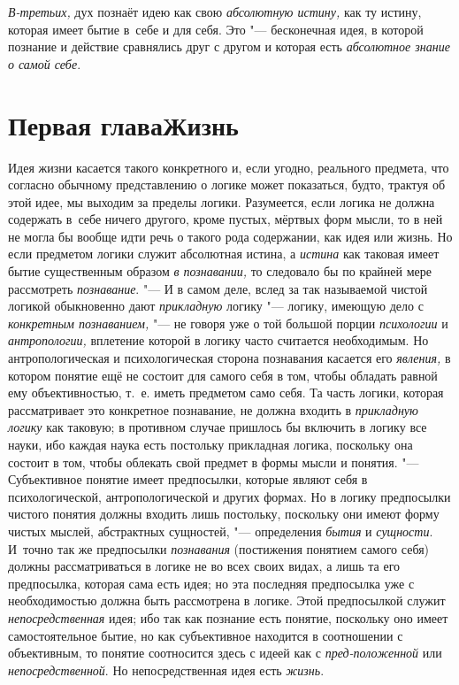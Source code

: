 {\em В-третьих,} дух
познаёт идею как свою {\em абсолютную
истину,} как ту истину, которая имеет бытие в~себе и для
себя. Это "--- бесконечная идея, в которой познание и действие
сравнялись друг с другом и которая есть
{\em абсолютное знание о самой себе}.

\chapter[Первая глава Жизнь]{Первая глава\newline Жизнь}

Идея жизни касается такого конкретного и, если угодно,
реального предмета, что согласно обычному представлению о логике может
показаться, будто, трактуя об этой идее, мы выходим за пределы логики.
Разумеется, если логика не должна содержать в~себе ничего другого, кроме
пустых, мёртвых форм мысли, то в ней не могла бы вообще идти речь о такого
рода содержании, как идея или жизнь. Но если предметом логики служит
абсолютная истина, а {\em истина}
как таковая имеет бытие существенным образом
{\em в познавании,} то
следовало бы по крайней мере рассмотреть {\em познавание}. "--- И в
самом деле, вслед за так называемой чистой логикой обыкновенно дают
{\em прикладную} логику "--- логику, имеющую дело с
{\em конкретным познаванием,} "--- не говоря уже о той большой порции
{\em психологии} и {\em антропологии,}
вплетение которой в логику часто считается необходимым. Но
антропологическая и психологическая сторона познавания касается его
{\em явления,} в котором
понятие ещё не состоит для самого себя в том, чтобы обладать равной ему
объективностью, т.~е. иметь предметом само себя. Та часть логики, которая
рассматривает это конкретное познавание, не должна входить в
{\em прикладную логику}
как таковую; в противном случае пришлось бы включить в логику
все науки, ибо каждая наука есть постольку прикладная логика, поскольку она
состоит в том, чтобы облекать свой предмет в формы мысли и понятия. "---
Субъективное понятие имеет предпосылки, которые являют себя в
психологической, антропологической и других формах. Но в логику предпосылки
чистого понятия должны входить лишь постольку, поскольку они имеют форму
чистых мыслей, абстрактных сущностей, "--- определения
{\em бытия} и {\em сущности}. И~точно
так же предпосылки {\em познавания}
(постижения понятием самого себя) должны
рассматриваться в логике не во всех своих видах, а лишь та
его предпосылка, которая сама есть идея; но эта последняя предпосылка уже с
необходимостью должна быть рассмотрена в логике. Этой предпосылкой служит
{\em непосредственная}
идея; ибо так как познание есть понятие, поскольку оно имеет
самостоятельное бытие, но как субъективное находится в соотношении с
объективным, то понятие соотносится здесь с идеей как с
{\em пред-положенной} или
{\em непосредственной}.
Но непосредственная идея есть
{\em жизнь}.

